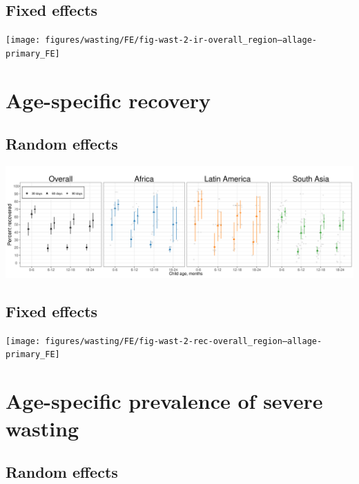 \documentclass[
  9pt,
]{book}
\begin{document}
\hypertarget{fixed-effects-3}{%
\subsection{Fixed effects}\label{fixed-effects-3}}

\texttt{[image: figures/wasting/FE/fig-wast-2-ir-overall\_region--allage-primary\_FE]}

\hypertarget{age-specific-recovery}{%
\section{Age-specific recovery}\label{age-specific-recovery}}

\hypertarget{random-effects-3}{%
\subsection{Random effects}\label{random-effects-3}}

\includegraphics[width=58.33in]{figures/wasting/fig-wast-2-rec-overall_region--allage-primary}

\hypertarget{fixed-effects-4}{%
\subsection{Fixed effects}\label{fixed-effects-4}}

\texttt{[image: figures/wasting/FE/fig-wast-2-rec-overall\_region--allage-primary\_FE]}

\hypertarget{age-specific-prevalence-of-severe-wasting}{%
\section{Age-specific prevalence of severe wasting}\label{age-specific-prevalence-of-severe-wasting}}

\hypertarget{random-effects-4}{%
\subsection{Random effects}\label{random-effects-4}}
\end{document}
